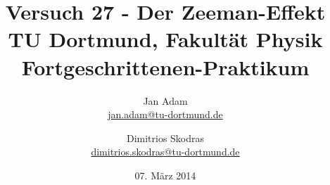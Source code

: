



\title{Versuch 27 - Der Zeeman-Effekt\\				%
\large TU Dortmund, Fakultät Physik\\ 
\normalsize Fortgeschrittenen-Praktikum}

\author{Jan Adam\\			%
{\small \href{jan.adam@tu-dortmund.de}{jan.adam@tu-dortmund.de}}	%
\and						%
Dimitrios Skodras\\					%
{\small \href{dimitrios.skodras@tu-dortmund.de}{dimitrios.skodras@tu-dortmund.de}}		%
}
\date{07. März 2014}				%





\maketitle					%
\thispagestyle{empty} 				%



\tableofcontents


\newpage					%


